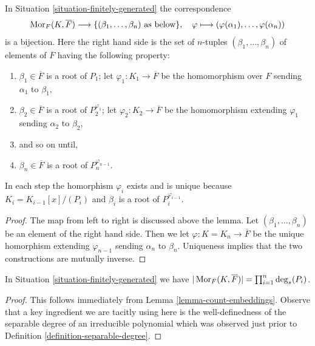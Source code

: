 \begin{lemma}
\label{lemma-count-embeddings}
In Situation \ref{situation-finitely-generated} the correspondence
$$
\mathop{\mathrm{Mor}}\nolimits_F(K, \overline{F})
\longrightarrow
\{(\beta_1, \ldots, \beta_n)\text{ as below}\},
\quad
\varphi \longmapsto (\varphi(\alpha_1), \ldots, \varphi(\alpha_n))
$$
is a bijection. Here the right hand side is the set of $n$-tuples
$(\beta_1, \ldots, \beta_n)$ of elements of $\overline{F}$ having
the following property:
\begin{enumerate}
\item $\beta_1 \in \overline{F}$ is a root of $P_1$;
let $\varphi_1 : K_1 \to \overline{F}$ be the homomorphism
over $F$ sending $\alpha_1$ to $\beta_1$,
\item $\beta_2 \in \overline{F}$ is a root of $P_2^{\varphi_1}$;
let $\varphi_2 : K_2 \to \overline{F}$ be the homomorphism
extending $\varphi_1$ sending $\alpha_2$ to $\beta_2$,
\item and so on until,
\item $\beta_n \in \overline{F}$ is a root of $P_n^{\varphi_{n - 1}}$.
\end{enumerate}
In each step the homorphism $\varphi_i$ exists and is unique because
$K_i = K_{i - 1}[x]/(P_i)$ and $\beta_i$ is a root of $P_i^{\varphi_{i - 1}}$.
\end{lemma}

\begin{proof}
The map from left to right is discussed above the lemma.
Let $(\beta_1, \ldots, \beta_n)$ be an element of the right hand side.
Then we let $\varphi : K = K_n \to \overline{F}$ be the unique homorphism
extending $\varphi_{n - 1}$ sending $\alpha_n$ to $\beta_n$.
Uniqueness implies that the two constructions are mutually inverse.
\end{proof}

\begin{lemma}
\label{lemma-count-embeddings-explicitly}
In Situation \ref{situation-finitely-generated} we have
$|\mathop{\mathrm{Mor}}\nolimits_F(K, \overline{F})| = \prod_{i = 1}^n \deg_s(P_i)$.
\end{lemma}

\begin{proof}
This follows immediately from Lemma \ref{lemma-count-embeddings}.
Observe that a key ingredient we are tacitly using here is the
well-definedness of the separable degree of an irreducible polynomial
which was observed just prior to
Definition \ref{definition-separable-degree}.
\end{proof}

